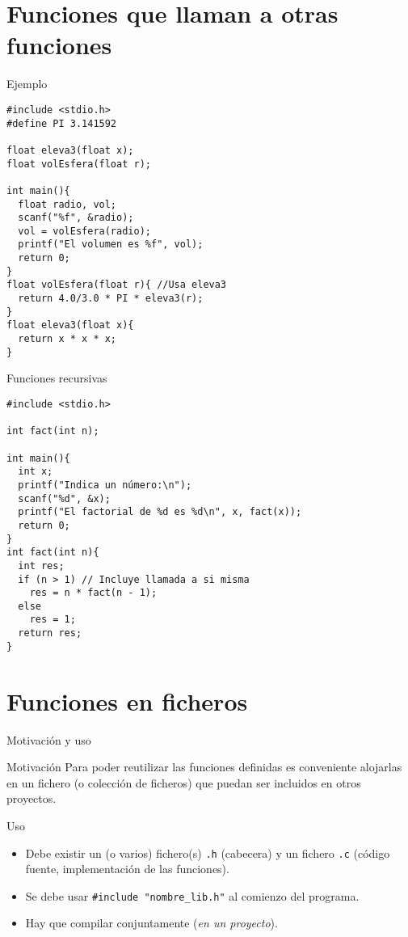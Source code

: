 \documentclass[xcolor={usenames,svgnames,dvipsnames}, aspectratio=169]{beamer}
\begin{document}
\section{Funciones que llaman a otras funciones}
\label{sec:org1ef430d}

\begin{frame}[label={sec:org3ca1f6d},fragile,plain]{Ejemplo}
 \lstset{language=C,label= ,caption= ,captionpos=b,numbers=none}
\begin{lstlisting}
#include <stdio.h>
#define PI 3.141592

float eleva3(float x);
float volEsfera(float r);

int main(){
  float radio, vol;
  scanf("%f", &radio);
  vol = volEsfera(radio);
  printf("El volumen es %f", vol);
  return 0;
}
float volEsfera(float r){ //Usa eleva3
  return 4.0/3.0 * PI * eleva3(r);
}
float eleva3(float x){
  return x * x * x;
}
\end{lstlisting}
\end{frame}
\begin{frame}[label={sec:orgc1f236f},fragile,plain]{Funciones recursivas}
 \lstset{language=C,label= ,caption= ,captionpos=b,numbers=none}
\begin{lstlisting}
#include <stdio.h>

int fact(int n);

int main(){
  int x;
  printf("Indica un número:\n");
  scanf("%d", &x);
  printf("El factorial de %d es %d\n", x, fact(x));
  return 0;
}
int fact(int n){
  int res;
  if (n > 1) // Incluye llamada a si misma
    res = n * fact(n - 1);
  else
    res = 1;
  return res;
}
\end{lstlisting}
\end{frame}

\section{Funciones en ficheros}
\label{sec:orgb015608}
\begin{frame}[label={sec:org2b6659c},fragile]{Motivación y uso}
 \begin{block}{Motivación}
Para poder reutilizar las funciones definidas es conveniente alojarlas
en un fichero (o colección de ficheros) que puedan ser incluidos en
otros proyectos.
\end{block}

\begin{block}{Uso}
\begin{itemize}
\item Debe existir un (o varios) fichero(s) \texttt{.h} (cabecera) y un fichero \texttt{.c} (código fuente, implementación de las funciones).
\item Se debe usar \texttt{\#include "nombre\_lib.h"} al comienzo del programa.
\item Hay que compilar conjuntamente (\emph{en un proyecto}).
\end{itemize}
\end{block}
\end{frame}
\end{document}
